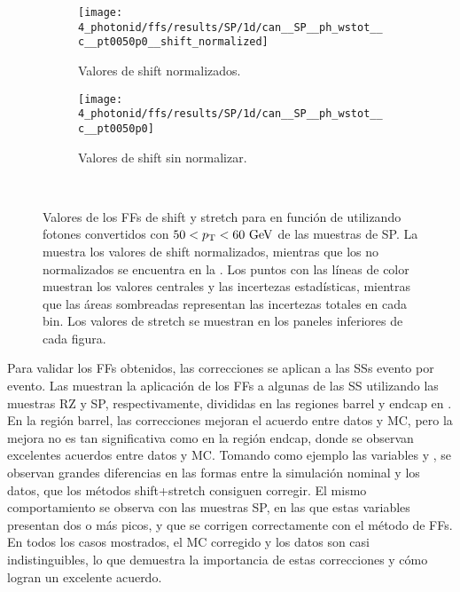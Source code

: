 \begin{figure}[ht!]
    \centering
    \begin{subfigure}[h]{0.49\linewidth}
        \centering
        \texttt{[image: 4\_photonid/ffs/results/SP/1d/can\_\_SP\_\_ph\_wstot\_\_c\_\_pt0050p0\_\_shift\_normalized]}
        \caption{Valores de shift normalizados.}
        \label{fig:ss_corrections:ffs:reslts:ffs_eta_wstot:normalised_shift}
    \end{subfigure}
    \hfill
    \begin{subfigure}[h]{0.49\linewidth}
        \centering
        \texttt{[image: 4\_photonid/ffs/results/SP/1d/can\_\_SP\_\_ph\_wstot\_\_c\_\_pt0050p0]}
        \caption{Valores de shift sin normalizar.}
        \label{fig:ss_corrections:ffs:reslts:ffs_eta_wstot:raw_shift}
    \end{subfigure}\\
    \caption{Valores de los \acp{FF} de shift y stretch para \wstot en funci\'on de \abseta utilizando fotones convertidos con \(50<p_{\text{T}}<60~\text{GeV}\) de las muestras de \ac{SP}. La  muestra los valores de shift normalizados, mientras que los no normalizados se encuentra en la . Los puntos con las l\'ineas de color muestran los valores centrales y las incertezas estad\'isticas, mientras que las \'areas sombreadas representan las incertezas totales en cada bin. Los valores de stretch se muestran en los paneles inferiores de cada figura.}
    \label{fig:ss_corrections:ffs:reslts:ffs_eta_wstot}
\end{figure}


Para validar los \acp{FF} obtenidos, las correcciones se aplican a las \acp{SS} evento por evento.
Las \Figs{\ref{fig:ss_corrections:ffs:results:ss_rz}}{\ref{fig:ss_corrections:ffs:results:ss_sp}} muestran la aplicación de los \acp{FF} a algunas de las \ac{SS} utilizando las muestras \ac{RZ} y \ac{SP}, respectivamente, divididas en las regiones barrel y endcap en \abseta. En la región barrel, las correcciones mejoran el acuerdo entre datos y \ac{MC}, pero la mejora no es tan significativa como en la región endcap, donde se observan excelentes acuerdos entre datos y \ac{MC}. Tomando como ejemplo las variables \wone y \wstot, se observan grandes diferencias en las formas entre la simulación nominal y los datos, que los métodos shift+stretch consiguen corregir. El mismo comportamiento se observa con las muestras \ac{SP}, en las que estas variables presentan dos o más picos, y que se corrigen correctamente con el método de \acp{FF}. En todos los casos mostrados, el \ac{MC} corregido y los datos son casi indistinguibles, lo que demuestra la importancia de estas correcciones y cómo logran un excelente acuerdo.

